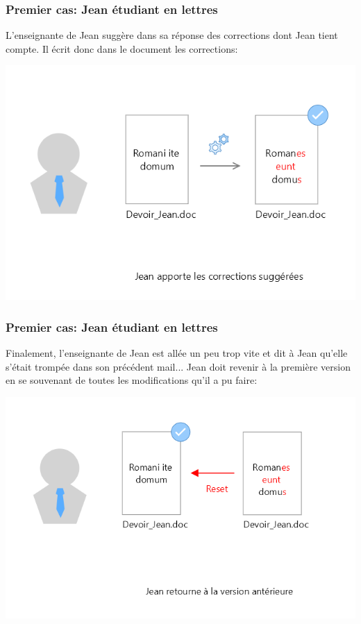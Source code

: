 \documentclass{beamer}
\begin{document}
\begin{frame}
\frametitle{Premier cas: Jean étudiant en lettres}
L'enseignante de Jean suggère dans sa réponse des corrections dont Jean tient compte. Il écrit donc dans le document les corrections:
\begin{center}
    \includegraphics[scale=0.3]{images/firstScenario/firstScenario_diapo2.png}
\end{center}
\end{frame}

\begin{frame}
\frametitle{Premier cas: Jean étudiant en lettres}
Finalement, l'enseignante de Jean est allée un peu trop vite et dit à Jean qu'elle s'était trompée dans son précédent mail... Jean doit revenir à la première version en se souvenant de toutes les modifications qu'il a pu faire:
\begin{center}
    \includegraphics[scale=0.3]{images/firstScenario/firstScenario_diapo3.png}
\end{center}
\end{frame}
\end{document}
